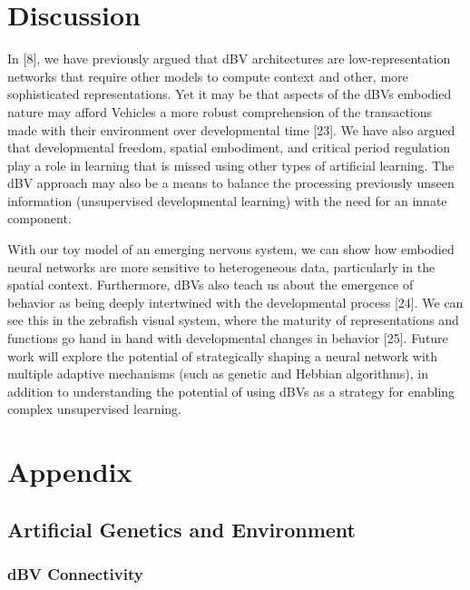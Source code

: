 \documentclass{article}
\begin{document}
\section{Discussion}

In [8], we have previously argued that dBV architectures are low-representation networks that require other models to compute context and other, more sophisticated representations. Yet it may be that aspects of the dBVs embodied nature may afford Vehicles  a more robust  comprehension of the transactions made with their environment over developmental time [23]. We have also argued that developmental freedom, spatial embodiment, and critical period regulation play a role in learning that is missed using other types of artificial learning. The dBV approach may also be a means to balance the processing previously unseen information (unsupervised developmental learning) with the need for an innate component. 

With our toy model of an emerging nervous system, we can show how embodied neural networks are more sensitive to heterogeneous data, particularly in the spatial context. Furthermore, dBVs also teach us about the emergence of behavior as being deeply intertwined with the developmental process [24]. We can see this in the zebrafish visual system, where the maturity of representations and functions go hand in hand with developmental changes in behavior [25]. Future work will explore the potential of strategically shaping a neural network with multiple adaptive mechanisms (such as genetic and Hebbian algorithms), in addition to understanding the potential of using dBVs as a strategy for enabling complex unsupervised learning. 

\section*{Appendix}

\subsection*{Artificial Genetics and Environment}

\subsubsection*{dBV Connectivity}
\end{document}
